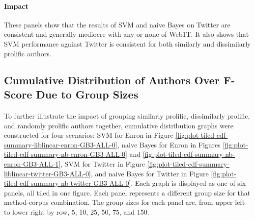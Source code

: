 		\paragraph*{Impact} These panels show that the results of SVM and naive Bayes on Twitter are consistent and generally mediocre with any or none of Web1T.  It also shows that SVM performance against Twitter is consistent for both similarly and dissimilarly prolific authors.

\subsection{Cumulative Distribution of Authors Over F-Score Due to Group Sizes}
\begin{comment}\paragraph*{} Figures \ref{fig:plot-tiled-cdf-summary-liblinear-enron-GB3-ALL-0}, \ref{fig:plot-tiled-cdf-summary-nb-enron-GB3-ALL-0}, \ref{fig:plot-tiled-cdf-summary-nb-enron-GB3-ALL-1}, \ref{fig:plot-tiled-cdf-summary-nb-enron-GB3-ALL-1}, and \ref{fig:plot-tiled-cdf-summary-nb-twitter-GB3-ALL-0} all display the cumulative distribution of authors over f-score as group size is increased. There are six panels in each figure.  The panels progress from upper left to bottom right through group sizes 5, 10, 25, 50, 75, and 150.  To provide a consistent presentation, all of these figures except Figure \ref{fig:plot-tiled-cdf-summary-nb-enron-GB3-ALL-1} display a Web1T\% of 0 for feature type GB3. Figure \ref{fig:plot-tiled-cdf-summary-nb-enron-GB3-ALL-1} displays a Web1T\% of 1 for feature type GB3 to present the difference in curvature between naive Bayes against Enron for both Web1T\% of 0 (Figure \ref{fig:plot-tiled-cdf-summary-nb-enron-GB3-ALL-0}) and a Web1T\% of 1 (Figure \ref{fig:plot-tiled-cdf-summary-nb-enron-GB3-ALL-1}).
\end{comment}
	\paragraph*{} To further illustrate the impact of grouping similarly prolific, dissimilarly prolific, and randomly prolific authors together, cumulative distribution graphs were constructed for four scenarios: SVM for Enron in Figure \ref{fig:plot-tiled-cdf-summary-liblinear-enron-GB3-ALL-0}, naive Bayes for Enron in Figures \ref{fig:plot-tiled-cdf-summary-nb-enron-GB3-ALL-0} and \ref{fig:plot-tiled-cdf-summary-nb-enron-GB3-ALL-1}, SVM for Twitter in Figure \ref{fig:plot-tiled-cdf-summary-liblinear-twitter-GB3-ALL-0}, and naive Bayes for Twitter in Figure \ref{fig:plot-tiled-cdf-summary-nb-twitter-GB3-ALL-0}.  Each graph is displayed as one of six panels, all tiled in one figure.  Each panel represents a different group size for that method-corpus combination.  The group sizes for each panel are, from upper left to lower right by row, 5, 10, 25, 50, 75, and 150.  
